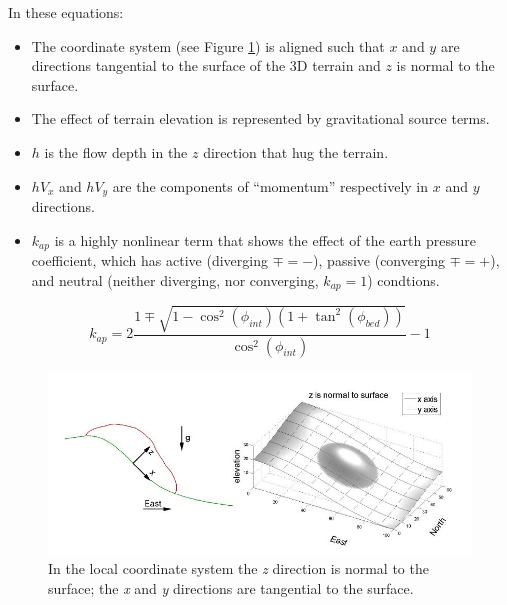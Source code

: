 \documentclass[letterpaper,10pt]{article}
\begin{document}
In these equations:
\begin{itemize}
	\item The coordinate system (see Figure \ref{xzeast}) is aligned such that $x$ and $y$ are directions tangential  
	      to the surface of the 3D terrain and $z$ is normal to the surface.
	\item The effect of terrain elevation is represented by gravitational source terms. 
	\item $h$ is the flow depth in the $z$ direction that hug the terrain.
	\item $hV_x$ and $hV_y$ are the components of ``momentum'' respectively in $x$ and $y$ directions.
	\item $k_{ap}$ is a highly nonlinear term that shows the effect of the earth pressure coefficient, which has active 
	      (diverging $\mp=-$), passive (converging $\mp=+$), and neutral (neither diverging, nor converging, $k_{ap}=1$) condtions.
\end{itemize}

\begin{equation}
	k_{ap}=2\frac{1\mp\sqrt{1-\cos^2(\phi_{int})\left(1+\tan^2(\phi_{bed})\right)}}{\cos^2(\phi_{int})}-1
\end{equation}

\begin{figure}[!t]
	\begin{center}
		 \includegraphics[height=2.8 truein]{IMAGES/1.jpg}
		\caption{In the local coordinate system the {\itshape z} direction is normal to the surface; 
		the {\itshape x} and {\itshape y} directions are tangential to the surface.}
		\label{xzeast}
	\end{center}
\end{figure}
\end{document}
